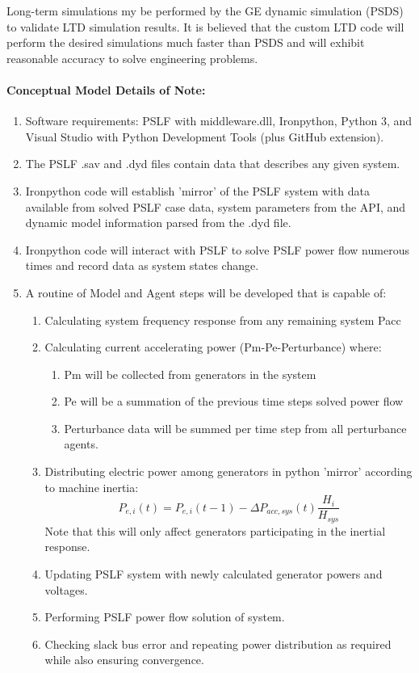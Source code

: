 \documentclass[12pt]{article}
\begin{document}
Long-term simulations my be performed by the GE dynamic simulation (PSDS) to validate LTD simulation results. It is believed that the custom LTD code will perform the desired simulations much faster than PSDS and will exhibit reasonable accuracy to solve engineering problems. 
\paragraph{Conceptual Model Details of Note:}
\begin{enumerate}
\item Software requirements: PSLF with middleware.dll, Ironpython, Python 3, and Visual Studio with Python Development Tools (plus GitHub extension).

\item The PSLF .sav and .dyd files contain data that describes any given system.

\item Ironpython code will establish 'mirror' of the PSLF system with data available from solved PSLF case data, system parameters from the API, and dynamic model information parsed from the .dyd file.

\item Ironpython code will interact with PSLF to solve PSLF power flow numerous times and record data as system states change.

\item A routine of Model and Agent steps will be developed that is capable of:
	\begin{enumerate}
		\item Calculating system frequency response from any remaining system Pacc
		\item Calculating current accelerating power  (Pm-Pe-Perturbance) where:
		\begin{enumerate}
			\item Pm will be collected from generators in the system
			\item Pe will be a summation of the previous time steps solved power flow
			\item Perturbance data will be summed per time step from all perturbance agents.
		\end{enumerate}
		\item Distributing electric power among generators in python 'mirror' according to machine inertia:
		\[ P_{e,i}(t) = P_{e,i}(t-1)-\Delta P_{acc,sys}(t)\dfrac{H_{i}}{H_{sys}} \]
		Note that this will only affect generators participating in the inertial response.
		\item Updating PSLF system with newly calculated generator powers and voltages.
		\item Performing PSLF power flow solution of system.
		\item Checking slack bus error and repeating power distribution as required while also ensuring convergence.
		

\end{enumerate}
\end{enumerate}
\end{document}

